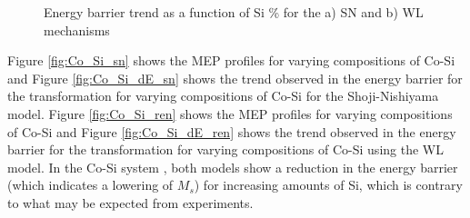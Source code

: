 \documentclass[preprint]{elsarticle}
\begin{document}
\begin{figure}[htp!]%
    \centering
\caption{Energy barrier trend as a function of Si \%  for the a) SN and b) WL mechanisms}
  \end{figure}
 Figure \ref{fig:Co_Si_sn} shows the MEP profiles for varying compositions of Co-Si  and Figure \ref{fig:Co_Si_dE_sn} shows the trend observed in the energy barrier for the transformation for varying compositions of Co-Si  for the Shoji-Nishiyama  model.
 Figure \ref{fig:Co_Si_ren} shows the MEP profiles for varying compositions of Co-Si   and Figure \ref{fig:Co_Si_dE_ren} shows the trend observed in the energy barrier for the transformation for varying compositions of Co-Si using the WL model. 
In the Co-Si system , both models show  a reduction in the energy barrier (which indicates a lowering of $M_s$) for increasing amounts of Si, which is contrary to what may be expected from experiments\cite{ma2010high}.
\end{document}
